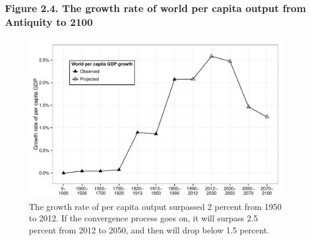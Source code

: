 \documentclass[t]{beamer}\usepackage[]{graphicx}\usepackage[]{color}
\newenvironment{knitrout}{}{} %
\begin{document}
\begin{frame}[label=Figure_2_4]
\frametitle{Figure 2.4. The growth rate of world per capita output from Antiquity to 2100}
\begin{figure}[t]
\begin{minipage}[b]{\textwidth}
\centering
\begin{knitrout}\footnotesize
{}\color{fgcolor}

{\centering \includegraphics[width=1\linewidth]{figures/bw/Figure_2_4} 

}



\end{knitrout}
\caption{The growth rate of per capita output surpassed 2 percent from 1950 to 2012. If the convergence process goes on, it will surpass 2.5 percent from 2012 to 2050, and then will drop below 1.5 percent.}
\end{minipage}
\end{figure}
\end{frame}
\end{document}
